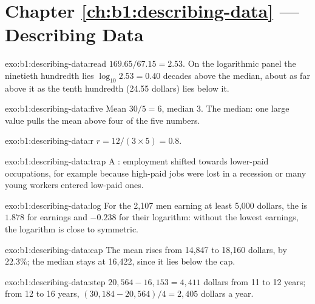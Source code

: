 \section*{Chapter \ref{ch:b1:describing-data} --- Describing Data}

\begin{solution}{exo:b1:describing-data:read}
$169.65/67.15 = 2.53$. On the logarithmic panel the ninetieth hundredth lies
$\log_{10} 2.53 = 0.40$ decades above the median, about as far above it as the
tenth hundredth (24.55 dollars) lies below it.
\end{solution}

\begin{solution}{exo:b1:describing-data:five}
Mean $30/5 = 6$, median $3$. The median: one large value pulls the mean above four
of the five numbers.
\end{solution}

\begin{solution}{exo:b1:describing-data:r}
$r = 12/(3 \times 5) = 0.8$.
\end{solution}

\begin{solution}{exo:b1:describing-data:trap}
A : employment shifted towards lower-paid occupations,
for example because high-paid jobs were lost in a recession or many
young workers entered low-paid ones.
\end{solution}

\begin{solution}{exo:b1:describing-data:log}
For the 2,107 men earning at least 5,000 dollars, the  is $1.878$ for
earnings and $-0.238$ for their logarithm: without the lowest earnings, the
logarithm is close to symmetric.
\end{solution}

\begin{solution}{exo:b1:describing-data:cap}
The mean rises from 14,847 to 18,160 dollars, by $22.3\%$; the median stays at
16,422, since it lies below the cap.
\end{solution}

\begin{solution}{exo:b1:describing-data:step}
$20{,}564 - 16{,}153 = 4{,}411$ dollars from 11 to 12 years; from 12 to 16 years,
$(30{,}184 - 20{,}564)/4 = 2{,}405$ dollars a year.
\end{solution}

